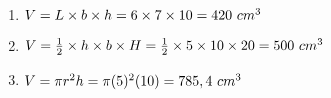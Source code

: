 \begin{exercises}{}
{}
\end{exercises}


 \begin{solutions}{}{
\begin{enumerate}[itemsep=5pt, label=\textbf{\arabic*}. ] 
\item $V = L \times b \times h \\
= 6 \times 7 \times 10 \\
= 420 ~cm^3$
\item $V = \frac{1}{2} \times h \times b \times H\\
= \frac{1}{2} \times 5 \times 10 \times 20 \\
=500 ~cm^3$
\item $V = \pi r^2 h \\
= \pi(5)^2(10)\\
= 785,4 ~cm^{3}$
\end{enumerate}}
\end{solutions}


